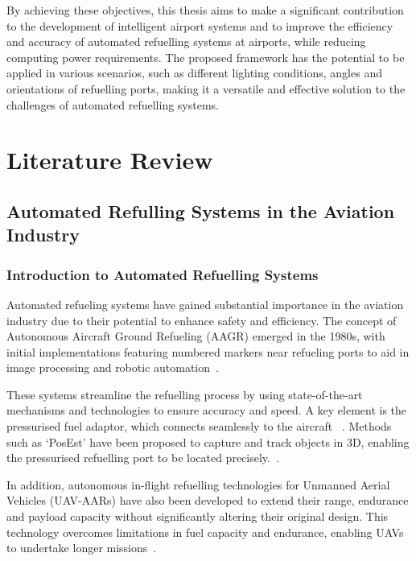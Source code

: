 \documentclass[12pt,oneside]{book} %
\begin{document}
By achieving these objectives, this thesis aims to make a significant
contribution to the development of intelligent airport systems and to improve
the efficiency and accuracy of automated refuelling systems at airports, while
reducing computing power requirements. The proposed framework has the potential
to be applied in various scenarios, such as different lighting conditions,
angles and orientations of refuelling ports, making it a versatile and
effective solution to the challenges of automated refuelling systems.

\chapter{Literature Review}
\section{Automated Refulling Systems in the Aviation Industry}
\subsection{Introduction to Automated Refuelling Systems}
Automated refueling systems have gained substantial importance in the aviation
industry due to their potential to enhance safety and efficiency. The concept
of Autonomous Aircraft Ground Refueling (AAGR) emerged in the 1980s, with
initial implementations featuring numbered markers near refueling ports to aid
in image processing and robotic automation~\cite{Schultz1986, Bennett1991,
    DatasetAGR}.

These systems streamline the refuelling process by using state-of-the-art
mechanisms and technologies to ensure accuracy and speed. A key element is the
pressurised fuel adaptor, which connects seamlessly to the aircraft
~\cite{HybridDatasetAGRV2}. Methods such as `PosEst' have been proposed to
capture and track objects in 3D, enabling the pressurised refuelling port to be
located precisely.~\cite{AGRPoseEstimation}.

In addition, autonomous in-flight refuelling technologies for Unmanned Aerial
Vehicles (UAV-AARs) have also been developed to extend their range, endurance
and payload capacity without significantly altering their original design. This
technology overcomes limitations in fuel capacity and endurance, enabling UAVs
to undertake longer missions~\cite{AARBinocularVision}.
\end{document}
